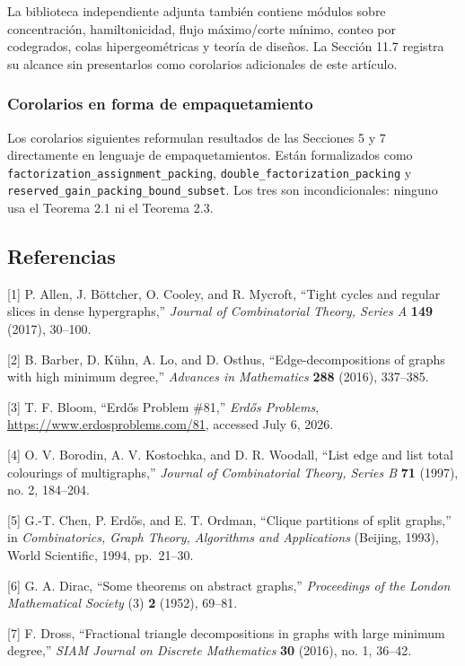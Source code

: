 \documentclass[spanish,11pt,a4paper]{article}
\begin{document}
La biblioteca independiente adjunta también contiene módulos sobre
concentración, hamiltonicidad, flujo máximo/corte mínimo, conteo por
codegrados, colas hipergeométricas y teoría de diseños. La Sección 11.7
registra su alcance sin presentarlos como corolarios adicionales de este
artículo.

\subsubsection{Corolarios en forma de
empaquetamiento}\label{corolarios-en-forma-de-empaquetamiento}

Los corolarios siguientes reformulan resultados de las Secciones 5 y 7
directamente en lenguaje de empaquetamientos. Están formalizados como
\nolinkurl{factorization_assignment_packing},
\nolinkurl{double_factorization_packing} y
\nolinkurl{reserved_gain_packing_bound_subset}. Los tres son
incondicionales: ninguno usa el Teorema 2.1 ni el Teorema 2.3.

\subsection{Referencias}\label{referencias}

{[}1{]} P. Allen, J. Böttcher, O. Cooley, and R. Mycroft, ``Tight cycles
and regular slices in dense hypergraphs,'' \emph{Journal of
Combinatorial Theory, Series A} \textbf{149} (2017), 30--100.

{[}2{]} B. Barber, D. Kühn, A. Lo, and D. Osthus, ``Edge-decompositions
of graphs with high minimum degree,'' \emph{Advances in Mathematics}
\textbf{288} (2016), 337--385.

{[}3{]} T. F. Bloom, ``Erdős Problem \#81,'' \emph{Erdős Problems},
\url{https://www.erdosproblems.com/81}, accessed July 6, 2026.

{[}4{]} O. V. Borodin, A. V. Kostochka, and D. R. Woodall, ``List edge
and list total colourings of multigraphs,'' \emph{Journal of
Combinatorial Theory, Series B} \textbf{71} (1997), no. 2, 184--204.

{[}5{]} G.-T. Chen, P. Erdős, and E. T. Ordman, ``Clique partitions of
split graphs,'' in \emph{Combinatorics, Graph Theory, Algorithms and
Applications} (Beijing, 1993), World Scientific, 1994, pp.~21--30.

{[}6{]} G. A. Dirac, ``Some theorems on abstract graphs,''
\emph{Proceedings of the London Mathematical Society} (3) \textbf{2}
(1952), 69--81.

{[}7{]} F. Dross, ``Fractional triangle decompositions in graphs with
large minimum degree,'' \emph{SIAM Journal on Discrete Mathematics}
\textbf{30} (2016), no. 1, 36--42.
\end{document}
